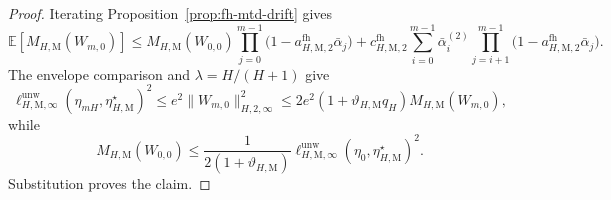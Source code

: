 \documentclass{article}
\begin{document}
\begin{proof}
Iterating Proposition~\ref{prop:fh-mtd-drift} gives
\begin{equation}
\mathbb E\left[M_{H,\mathrm M}(W_{m,0})\right]\le
M_{H,\mathrm M}(W_{0,0})\prod_{j=0}^{m-1}\bigl(1-a_{H,\mathrm M,2}^{\mathrm{fh}}\bar\alpha_j\bigr)
+c_{H,\mathrm M,2}^{\mathrm{fh}}\sum_{i=0}^{m-1}\bar\alpha_i^{(2)}
\prod_{j=i+1}^{m-1}\bigl(1-a_{H,\mathrm M,2}^{\mathrm{fh}}\bar\alpha_j\bigr).
\end{equation}
The envelope comparison and $\lambda=H/(H+1)$ give
\begin{equation}
\ell_{H,\mathrm M,\infty}^{\mathrm{unw}}(\eta_{mH},\eta_{H,\mathrm M}^\star)^2
\le e^2\lVert W_{m,0}\rVert_{H,2,\infty}^2
\le2e^2(1+\vartheta_{H,\mathrm M}q_H)M_{H,\mathrm M}(W_{m,0}),
\end{equation}
while
\begin{equation}
M_{H,\mathrm M}(W_{0,0})\le\frac{1}{2(1+\vartheta_{H,\mathrm M})}
\ell_{H,\mathrm M,\infty}^{\mathrm{unw}}(\eta_0,\eta_{H,\mathrm M}^\star)^2.
\end{equation}
Substitution proves the claim.
\end{proof}
\end{document}
